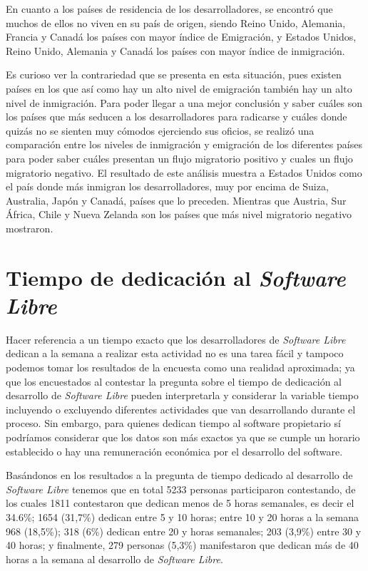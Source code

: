 En cuanto a los países de residencia de los desarrolladores, se encontró que muchos de ellos no viven en su país de origen, siendo Reino Unido, Alemania, Francia y Canadá los países con mayor índice de Emigración, y Estados Unidos, Reino Unido, Alemania y Canadá los países con mayor índice de inmigración. 

Es curioso ver la contrariedad que se presenta en esta situación, pues existen países en los que así como hay un alto nivel de emigración también hay un alto nivel de inmigración. Para poder llegar a una mejor conclusión y saber cuáles son los países que más seducen a los desarrolladores para radicarse y cuáles donde quizás no se sienten muy cómodos ejerciendo sus oficios, se realizó una comparación entre los niveles de inmigración y emigración de los diferentes países para poder saber cuáles presentan un flujo migratorio positivo  y cuales un flujo migratorio negativo. El resultado de este análisis muestra a Estados Unidos como el país donde más inmigran los desarrolladores, muy por encima de Suiza, Australia, Japón y Canadá, países que lo preceden. Mientras que Austria, Sur África, Chile y Nueva Zelanda son los países que más nivel migratorio negativo mostraron.

\section{Tiempo de dedicación al \textit{Software Libre}}

Hacer referencia a un tiempo exacto que los desarrolladores de \textit{Software Libre} dedican a la semana a realizar esta actividad no es una tarea fácil y tampoco podemos tomar los resultados de la encuesta como una realidad aproximada; ya que los encuestados al contestar la pregunta sobre el tiempo de dedicación al desarrollo de \textit{Software Libre} pueden interpretarla y considerar la variable tiempo incluyendo o excluyendo diferentes actividades que van desarrollando durante el proceso. Sin embargo, para quienes dedican tiempo al software propietario sí podríamos considerar que los datos son más exactos ya que se cumple un horario establecido o hay una remuneración económica por el desarrollo del software.

Basándonos en los resultados a la pregunta de tiempo dedicado al desarrollo de \textit{Software Libre} tenemos que en total 5233 personas  participaron contestando, de los cuales 1811 contestaron que dedican menos de 5 horas semanales, es decir el 34.6\%; 1654 (31,7\%) dedican entre 5 y 10 horas; entre 10 y 20 horas a la semana 968 (18,5\%); 318 (6\%) dedican entre 20 y horas semanales; 203 (3,9\%) entre 30 y 40 horas; y finalmente, 279 personas (5,3\%) manifestaron que dedican más de 40 horas a la semana al desarrollo de \textit{Software Libre}.

